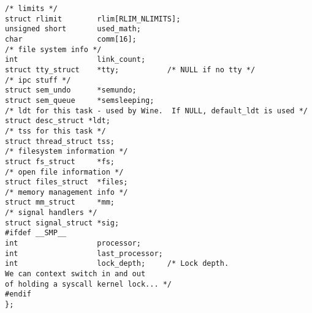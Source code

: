 \documentclass[10pt,letterpaper,onecolumn,draftclsnofoot]{IEEEtran}
\begin{document}
\begin{lstlisting}[caption=The Linux task\_struct is responsible for keeping track of the state of each process.]
/* limits */
struct rlimit        rlim[RLIM_NLIMITS];
unsigned short       used_math;
char                 comm[16];
/* file system info */
int                  link_count;
struct tty_struct    *tty;           /* NULL if no tty */
/* ipc stuff */
struct sem_undo      *semundo;
struct sem_queue     *semsleeping;
/* ldt for this task - used by Wine.  If NULL, default_ldt is used */
struct desc_struct *ldt;
/* tss for this task */
struct thread_struct tss;
/* filesystem information */
struct fs_struct     *fs;
/* open file information */
struct files_struct  *files;
/* memory management info */
struct mm_struct     *mm;
/* signal handlers */
struct signal_struct *sig;
#ifdef __SMP__
int                  processor;
int                  last_processor;
int                  lock_depth;     /* Lock depth.
We can context switch in and out
of holding a syscall kernel lock... */
#endif
};
\end{lstlisting}
\end{document}
